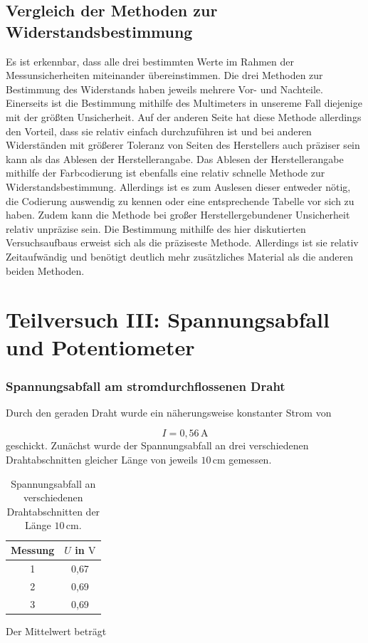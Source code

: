 \documentclass{report}
\begin{document}
\subsection{Vergleich der Methoden zur Widerstandsbestimmung}
Es ist erkennbar, dass alle drei bestimmten Werte im Rahmen der Messunsicherheiten miteinander übereinstimmen.
Die drei Methoden zur Bestimmung des Widerstands haben jeweils mehrere Vor- und Nachteile. Einerseits ist die Bestimmung mithilfe des Multimeters in unsereme Fall 
diejenige mit der größten Unsicherheit. Auf der anderen Seite hat diese Methode allerdings den Vorteil, dass sie relativ einfach durchzuführen ist und bei anderen 
Widerständen mit größerer Toleranz von Seiten des Herstellers auch präziser sein kann als das Ablesen der Herstellerangabe.
Das Ablesen der Herstellerangabe mithilfe der Farbcodierung ist ebenfalls eine relativ schnelle Methode zur Widerstandsbestimmung. Allerdings ist es 
zum Auslesen dieser entweder nötig, die Codierung auswendig zu kennen oder eine entsprechende Tabelle vor sich zu haben. Zudem kann die Methode bei großer 
Herstellergebundener Unsicherheit relativ unpräzise sein.
Die Bestimmung mithilfe des hier diskutierten Versuchsaufbaus erweist sich als die präziseste Methode. Allerdings ist sie relativ Zeitaufwändig und benötigt 
deutlich mehr zusätzliches Material als die anderen beiden Methoden.
\newpage
\section{Teilversuch III: Spannungsabfall und Potentiometer}
\subsubsection{Spannungsabfall am stromdurchflossenen Draht}
\noindent
Durch den geraden Draht wurde ein näherungsweise konstanter Strom von

\begin{equation}
I=0{,}56\,\mathrm{A}
\end{equation}
\noindent
geschickt. Zunächst wurde der Spannungsabfall an drei verschiedenen
Drahtabschnitten gleicher Länge von jeweils $10\,\mathrm{cm}$ gemessen.

\begin{table}[htbp]
    \centering
    \caption{Spannungsabfall an verschiedenen Drahtabschnitten der Länge
    $10\,\mathrm{cm}$.}
    \label{tab:draht_10cm}
    \begin{tabular}{c|c}
        \hline
        Messung & $U$ in $\mathrm{V}$\\
        \hline
        1 & 0{,}67\\
        2 & 0{,}69\\
        3 & 0{,}69\\
        \hline
    \end{tabular}
\end{table}
\noindent
Der Mittelwert beträgt
\end{document}
